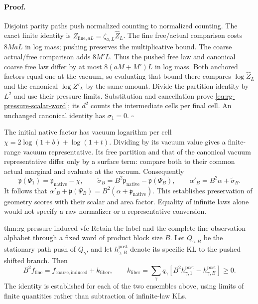 \paragraph{Proof.}
Disjoint parity paths push normalized counting to normalized counting.
The exact finite identity is
$Z_{\mathrm{fine},aL}=\zeta_{a,L}\widehat Z_L$.
The fine free/actual comparison costs $8MaL$ in log mass; pushing preserves
the multiplicative bound. The coarse actual/free comparison adds $8M'L$.
Thus the pushed free law and canonical coarse free law differ by at most
$8(aM+M')L$ in log mass. Both anchored factors equal one at the vacuum,
so evaluating that bound there compares $\log\widehat Z_L$ and the
canonical $\log Z'_L$ by the same amount. Divide the partition identity
by $L^2$ and use their pressure limits. Substitution and cancellation
prove \cref{eq:rg-pressure-scalar-word}; its $d^2$ counts the intermediate
cells per final cell. An unchanged canonical identity has $\sigma_1=0$.
$\square$

The initial native factor has vacuum logarithm per cell
$\chi=2\log(1+b)+\log(1+t)$. Dividing by its vacuum value gives a
finite-range vacuum representative. Its free partition and that of the
canonical vacuum representative differ only by a surface term: compare
both to their common actual marginal and evaluate at the vacuum.
Consequently
\begin{equation}
 \mathfrak p(\Psi_1)=\mathfrak p_{\mathrm{native}}-\chi,\qquad
 \widetilde\sigma_B=B^2\mathfrak p_{\mathrm{native}}
                            -\mathfrak p(\Psi_B),\qquad
 \alpha'_B=B^2\alpha+\widetilde\sigma_B.
 \label{eq:rg-pressure-native-scalar}
\end{equation}
It follows that $\alpha'_B+\mathfrak p(\Psi_B)
=B^2(\alpha+\mathfrak p_{\mathrm{native}})$.
This establishes preservation of geometry scores with their scalar and
area factor. Equality of infinite laws alone would not specify a raw
normalizer or a representative conversion. 

{thm:rg-pressure-induced-vfe}
Retain the label and the complete fine observation alphabet through a fixed
word of product block size $B$. Let $Q_{\gamma,B}$ be the stationary path
push of $Q_\gamma$, and let $h^{\mathrm{post}}_{\gamma,B}$ denote its
specific KL to the pushed shifted branch. Then
\begin{equation}
 B^2 f_{\mathrm{fine}}
   =f_{\mathrm{coarse,induced}}+k_{\mathrm{fiber}},\qquad
 k_{\mathrm{fiber}}=\sum_\gamma q_\gamma
 \left[B^2h^{\mathrm{post}}_{\gamma,1}
             -h^{\mathrm{post}}_{\gamma,B}\right]\geq0.
 \label{eq:rg-pressure-induced-vfe}
\end{equation}
The identity is established for each of the two ensembles above, using
limits of finite quantities rather than subtraction of infinite-law KLs.

